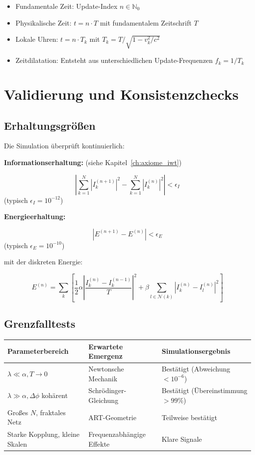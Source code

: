 \begin{itemize}
    \item Fundamentale Zeit: Update-Index \( n \in \mathbb{N}_0 \)
    \item Physikalische Zeit: \( t = n \cdot T \) mit fundamentalem Zeitschrift \( T \)
    \item Lokale Uhren: \( t = n \cdot T_k \) mit \( T_k = T / \sqrt{1 - v_k^2/c^2} \)
    \item Zeitdilatation: Entsteht aus unterschiedlichen Update-Frequenzen \( f_k = 1/T_k \)
\end{itemize}

\section{Validierung und Konsistenzchecks}
\label{app:numerik_validierung}

\subsection{Erhaltungsgrößen}
\label{sub:numerik_erhaltung}

Die Simulation überprüft kontinuierlich:

\noindent
\textbf{Informationserhaltung:} (siehe Kapitel~\ref{ch:axiome_iwt})

\[
\left| \sum_{k=1}^{N} |I_k^{(n+1)}|^2 - \sum_{k=1}^{N} |I_k^{(n)}|^2 \right| < \epsilon_I
\]
(typisch \( \epsilon_I = 10^{-12} \))

\noindent
\textbf{Energieerhaltung:}

\[
\left| E^{(n+1)} - E^{(n)} \right| < \epsilon_E
\]
(typisch \( \epsilon_E = 10^{-10} \))

mit der diskreten Energie:

\[
E^{(n)} = \sum_k \left[ \frac{1}{2} \alpha \left| \frac{I_k^{(n)} - I_k^{(n-1)}}{T} \right|^2 + \beta \sum_{l \in \mathcal{N}(k)} \left| I_k^{(n)} - I_l^{(n)} \right|^2 \right]
\]

\subsection{Grenzfalltests}
\label{sub:numerik_grenzfaelle}

\begin{tabular}{|l|l|l|}
\hline
\textbf{Parameterbereich} & \textbf{Erwartete Emergenz} & \textbf{Simulationsergebnis} \\
\hline
\( \lambda \ll \alpha, T \to 0 \) & Newtonsche Mechanik & Bestätigt (Abweichung \( < 10^{-6} \)) \\
\( \lambda \gg \alpha, \Delta\phi \) kohärent & Schrödinger-Gleichung & Bestätigt (Übereinstimmung \( > 99\% \)) \\
Großes \( N \), fraktales Netz & ART-Geometrie & Teilweise bestätigt \\
Starke Kopplung, kleine Skalen & Frequenzabhängige Effekte & Klare Signale \\
\hline
\end{tabular}

